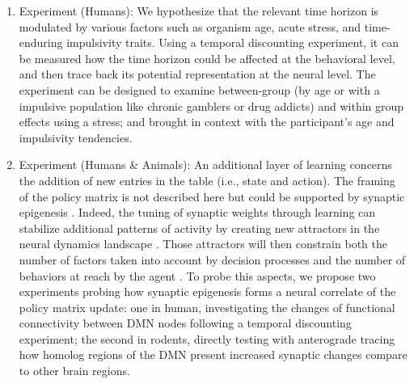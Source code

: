 \documentclass[10pt,letterpaper]{article}
\begin{document}
\begin{mdframed}
\begin{enumerate}
\item Experiment (Humans): We hypothesize that the relevant time horizon is modulated by various factors such as organism age, acute stress, and time-enduring impulsivity traits. Using a temporal discounting experiment, it can be measured how the time horizon could be affected at the behavioral level, and then trace back its potential representation at the neural level. The experiment can be designed to examine between-group (by age or with a impulsive population like chronic gamblers or drug addicts) and within group effects using a stress; and brought in context with the participant’s age and impulsivity tendencies.


\item Experiment (Humans \& Animals): An additional layer of learning concerns the addition of new entries in the table (i.e., state and action). The framing of the policy matrix is not described here but could be supported by synaptic epigenesis \citep{gisiger_acquisition_2005}. Indeed, the tuning of synaptic weights through learning can stabilize additional patterns of activity by creating new attractors in the neural dynamics landscape \citep{takeuchi_synaptic_2014}. Those attractors will then constrain both the number of factors taken into account by decision processes and the number of behaviors at reach by the agent \citep{wang_decision_2008}. To probe this aspects, we propose two experiments probing how synaptic epigenesis forms a neural correlate of the policy matrix update: one in human, investigating the changes of functional connectivity between DMN nodes following a temporal discounting experiment; the second in rodents, directly testing with anterograde tracing how homolog regions of the DMN present increased synaptic changes compare to other brain regions.

\end{enumerate}
\end{mdframed}
\end{document}
